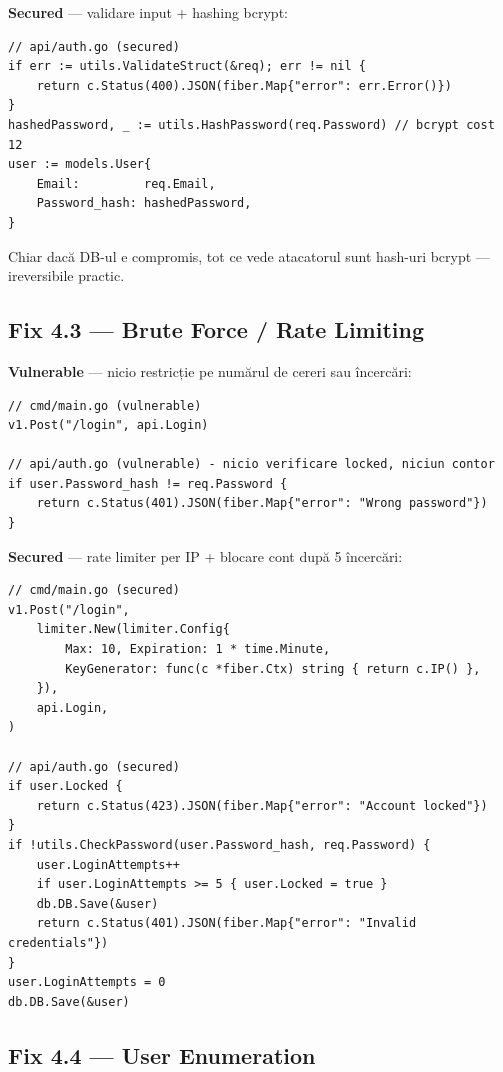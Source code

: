 \documentclass[12pt]{article}
\begin{document}
\textbf{Secured} --- validare input + hashing bcrypt:
\begin{lstlisting}[language={}]
// api/auth.go (secured)
if err := utils.ValidateStruct(&req); err != nil {
    return c.Status(400).JSON(fiber.Map{"error": err.Error()})
}
hashedPassword, _ := utils.HashPassword(req.Password) // bcrypt cost 12
user := models.User{
    Email:         req.Email,
    Password_hash: hashedPassword,
}
\end{lstlisting}

Chiar dacă DB-ul e compromis, tot ce vede atacatorul sunt hash-uri bcrypt --- ireversibile practic.

\subsection{Fix 4.3 --- Brute Force / Rate Limiting}

\textbf{Vulnerable} --- nicio restricție pe numărul de cereri sau încercări:
\begin{lstlisting}[language={}]
// cmd/main.go (vulnerable)
v1.Post("/login", api.Login)

// api/auth.go (vulnerable) - nicio verificare locked, niciun contor
if user.Password_hash != req.Password {
    return c.Status(401).JSON(fiber.Map{"error": "Wrong password"})
}
\end{lstlisting}

\textbf{Secured} --- rate limiter per IP + blocare cont după 5 încercări:
\begin{lstlisting}[language={}]
// cmd/main.go (secured)
v1.Post("/login",
    limiter.New(limiter.Config{
        Max: 10, Expiration: 1 * time.Minute,
        KeyGenerator: func(c *fiber.Ctx) string { return c.IP() },
    }),
    api.Login,
)

// api/auth.go (secured)
if user.Locked {
    return c.Status(423).JSON(fiber.Map{"error": "Account locked"})
}
if !utils.CheckPassword(user.Password_hash, req.Password) {
    user.LoginAttempts++
    if user.LoginAttempts >= 5 { user.Locked = true }
    db.DB.Save(&user)
    return c.Status(401).JSON(fiber.Map{"error": "Invalid credentials"})
}
user.LoginAttempts = 0
db.DB.Save(&user)
\end{lstlisting}

\subsection{Fix 4.4 --- User Enumeration}
\end{document}
